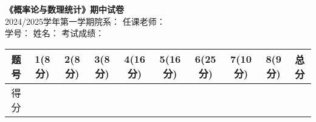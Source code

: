 \documentclass[10pt,addpoints,portrait]{exam}
\begin{document}
	
	\begin{center}
		\textbf{《概率论与数理统计》期中试卷} \\
		2024/2025学年第一学期\hspace{0.3cm}院系：\underline{\hspace{1in}}\hspace{0.3cm} 任课老师：\underline{\hspace{1in}} \\
		学号：\underline{\hspace{1in}}\hspace{0.3cm} 姓名：\underline{\hspace{1in}}\hspace{0.3cm} 考试成绩：\underline{\hspace{1in}}
		{	\small
			\begin{tabular}{|c|c|c|c|c|c|c|c|c|c|}
				\hline
				题号 & 1(8分) &2(8分)&3(8分) & 4(16分)& 5(16分) & 6(25分) & 7(10分) & 8(9分) & 总分 \\
				\hline
				得分 &  &  & & &  &  &  &  &  \\
				\hline
			\end{tabular}
		}
	\end{center} 
\end{document}
